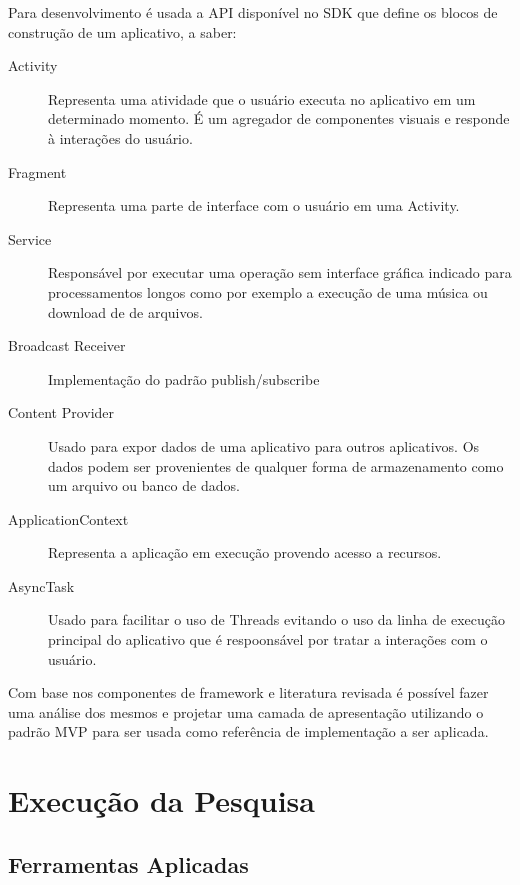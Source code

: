 \documentclass[conference]{IEEEtran}
\begin{document}

Para desenvolvimento é usada a API disponível no SDK que define
os blocos de construção de um aplicativo, a saber:

\begin{description}
  \item[Activity] Representa uma atividade que o usuário executa no aplicativo
  em um determinado momento. É um agregador de componentes visuais e responde à
  interações do usuário.
  \item[Fragment] Representa uma parte de interface com o usuário em uma
  Activity.
  \item[Service] Responsável por executar uma operação sem interface gráfica
  indicado para processamentos longos como por exemplo a execução de uma música
  ou download de de arquivos.
  \item[Broadcast Receiver] Implementação do padrão publish/subscribe 
  \item[Content Provider] Usado para expor dados de uma aplicativo para outros
  aplicativos. Os dados podem ser provenientes de qualquer forma de
  armazenamento como um arquivo ou banco de dados.
  \item[ApplicationContext] Representa a aplicação em execução provendo acesso
  a recursos.
  \item[AsyncTask] Usado para facilitar o uso de Threads evitando o uso
  da linha de execução principal do aplicativo que é respoonsável por tratar a
  interações com o usuário.
\end{description}

Com base nos componentes de framework e literatura revisada é possível fazer
uma análise dos mesmos e projetar uma camada de apresentação utilizando o padrão
MVP para ser usada como referência de implementação a ser aplicada.

\section{Execução da Pesquisa}


\subsection{Ferramentas Aplicadas}
\end{document}
